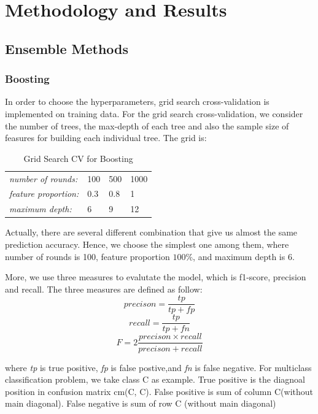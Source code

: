 \documentclass[paper=a4, fontsize=11pt]{scrartcl}
\begin{document}
\section*{Methodology and Results}
\subsection*{Ensemble Methods}
\subsubsection*{Boosting}

In order to choose the hyperparameters, grid search cross-validation is implemented on training data.
For the grid search cross-validation, we consider the number of trees, the max-depth of each tree and also the sample size of feasures for building each individual tree.
The grid is:

\begin{table}[ht]
\centering
\caption{Grid Search CV for Boosting}
\label{my-label}
\begin{tabular}{llll}
\hline
\textit{number of rounds:} & 100 & 500 & 1000 \\
\textit{feature proportion:}     & 0.3 & 0.8 & 1   \\
\textit{maximum depth:}    & 6   & 9   & 12  \\ \hline
\end{tabular}
\end{table}

Actually, there are several different combination that give us almost the same prediction accuracy. Hence, we choose the simplest one among them, where number of rounds is 100, feature proportion $100\%$, and maximum depth is 6.

More, we use three measures to evalutate the model, which is f1-score, precision and recall.
The three measures are defined as follow:
\[precison = \frac{{tp}}{{tp + fp}}\]
\[recall = \frac{{tp}}{{tp + fn}}\]
\[F = 2\frac{{precison \times recall}}{{precison + recall}}\]

where \textit{tp} is true positive, \textit{fp} is false postive,and \textit{fn} is false negative. For multiclass classification problem, we take class C as example. True positive is the diagnoal position in confusion matrix cm(C, C). False positive is sum of column C(without main diagonal). False negative is sum of row C (without main diagonal)
\end{document}
